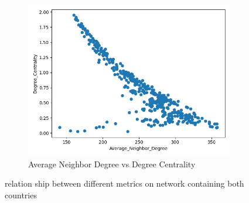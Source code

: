 \begin{figure}[H]
\begin{subfigure}[b]{0.3\textwidth}
     \end{subfigure}
     \hfill
     \begin{subfigure}[b]{0.3\textwidth}
         \centering
         \includegraphics[width=\textwidth]{images/comparison/ALL/relationship_Average_Neighbor_Degree_vs_Degree_Centrality_ALL.png}
         \caption{Average Neighbor Degree vs Degree Centrality}
     \end{subfigure}
        \caption{relation ship between different metrics on network containing both countries}
        \label{fig:ALL2}
\end{figure}


